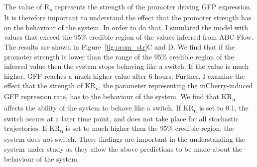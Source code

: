 The value of R\textsubscript{u} represents the strength of the promoter driving GFP expression. It is therefore important to understand the effect that the promoter strength has on the behaviour of the system. In order to do that, I simulated the model with values that exceed the 95\% credible region of the values inferred from ABC-Flow. The results are shown in Figure~\ref{fig:prom_str}C and D. We find that if the promoter strength is lower than the range of the 95\% credible region of the inferred value then the system stops behaving like a switch. If the value is much higher, GFP reaches a much higher value after 6 hours. Further, I examine the effect that the strength of KR\textsubscript{u}, the parameter representing the mCherry-induced GFP repression rate, has to the behaviour of the system. We find that KR\textsubscript{u} affects the ability of the system to behave like a switch. If KR\textsubscript{u} is set to 0.1, the switch occurs at a later time point, and does not take place for all stochastic trajectories. If KR\textsubscript{u} is set to much higher than the 95\% credible region, the system does not switch. These findings are important in the understanding the system under study as they allow the above predictions to be made about the behaviour of the system.  


